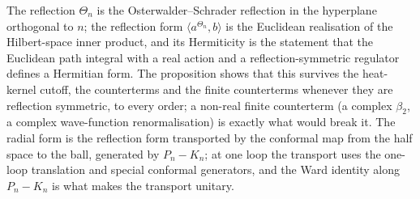 \begin{remark}
The reflection $\Theta_n$ is the Osterwalder--Schrader reflection in the hyperplane orthogonal to $n$; the reflection form $\langle a^{\Theta_n},b\rangle$ is the Euclidean realisation of the Hilbert-space inner product, and its Hermiticity is the statement that the Euclidean path integral with a real action and a reflection-symmetric regulator defines a Hermitian form. The proposition shows that this survives the heat-kernel cutoff, the counterterms and the finite counterterms whenever they are reflection symmetric, to every order; a non-real finite counterterm (a complex $\beta_2$, a complex wave-function renormalisation) is exactly what would break it. The radial form is the reflection form transported by the conformal map from the half space to the ball, generated by $P_n-K_n$; at one loop the transport uses the one-loop translation and special conformal generators, and the Ward identity along $P_n-K_n$ is what makes the transport unitary.
\end{remark}
